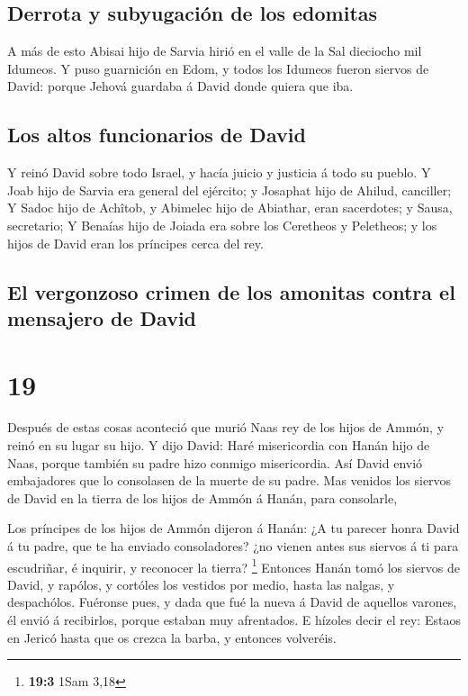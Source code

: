\hypertarget{derrota-y-subyugaciuxf3n-de-los-edomitas}{%
\subsection{Derrota y subyugación de los
edomitas}\label{derrota-y-subyugaciuxf3n-de-los-edomitas}}

 A más de esto Abisai hijo de Sarvia hirió en el valle de
la Sal dieciocho mil Idumeos.  Y puso guarnición en Edom,
y todos los Idumeos fueron siervos de David: porque Jehová guardaba á
David donde quiera que iba.

\hypertarget{los-altos-funcionarios-de-david}{%
\subsection{Los altos funcionarios de
David}\label{los-altos-funcionarios-de-david}}

 Y reinó David sobre todo Israel, y hacía juicio y
justicia á todo su pueblo.  Y Joab hijo de Sarvia era
general del ejército; y Josaphat hijo de Ahilud, canciller;
 Y Sadoc hijo de Achîtob, y Abimelec hijo de Abiathar,
eran sacerdotes; y Sausa, secretario;  Y Benaías hijo de
Joiada era sobre los Ceretheos y Peletheos; y los hijos de David eran
los príncipes cerca del rey.

\hypertarget{el-vergonzoso-crimen-de-los-amonitas-contra-el-mensajero-de-david}{%
\subsection{El vergonzoso crimen de los amonitas contra el mensajero de
David}\label{el-vergonzoso-crimen-de-los-amonitas-contra-el-mensajero-de-david}}

\hypertarget{section-18}{%
\section{19}\label{section-18}}

 Después de estas cosas aconteció que murió Naas rey de
los hijos de Ammón, y reinó en su lugar su hijo.  Y dijo
David: Haré misericordia con Hanán hijo de Naas, porque también su padre
hizo conmigo misericordia. Así David envió embajadores que lo consolasen
de la muerte de su padre. Mas venidos los siervos de David en la tierra
de los hijos de Ammón á Hanán, para consolarle,

 Los príncipes de los hijos de Ammón dijeron á Hanán: ¿A
tu parecer honra David á tu padre, que te ha enviado consoladores? ¿no
vienen antes sus siervos á ti para escudriñar, é inquirir, y reconocer
la tierra? \footnote{\textbf{19:3} 1Sam 3,18}  Entonces
Hanán tomó los siervos de David, y rapólos, y cortóles los vestidos por
medio, hasta las nalgas, y despachólos.  Fuéronse pues, y
dada que fué la nueva á David de aquellos varones, él envió á
recibirlos, porque estaban muy afrentados. E hízoles decir el rey:
Estaos en Jericó hasta que os crezca la barba, y entonces volveréis.

